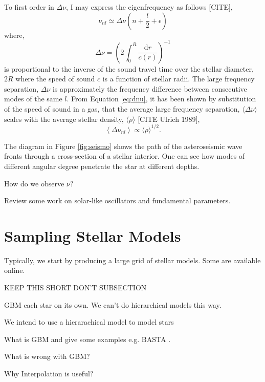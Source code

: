 To first order in $\Delta\nu$, I may express the eigenfrequency as follows [CITE],
%
\begin{equation}
    \nu_{nl} \simeq \Delta \nu\left(n+ \frac{l}{2} + \epsilon\right)
\end{equation}
%
where,
%
\begin{equation}
    \Delta \nu = \left(2 \int_{0}^{R} \frac{\mathrm{d} r}{c(r)}\right)^{-1}
    \label{eq:dnu}
\end{equation}
%
is proportional to the inverse of the sound travel time over the stellar diameter, $2R$ where the speed of sound $c$ is a function of stellar radii. The large frequency separation, $\Delta\nu$ is approximately the frequency difference between consecutive modes of the same $l$. From Equation \ref{eq:dnu}, it has been shown by substitution of the speed of sound in a gas, that the average large frequency separation, $\langle \Delta \nu \rangle$ scales with the average stellar density, $\langle\rho\rangle$ [CITE Ulrich 1989],
%
\begin{equation}
    \left\langle\Delta \nu_{n l}\right\rangle \propto \langle\rho\rangle^{1 / 2}.
\end{equation}
%

The diagram in Figure \ref{fig:seismo} shows the path of the asteroseismic wave fronts through a cross-section of a stellar interior. One can see how modes of different angular degree penetrate the star at different depths.

How do we observe $\nu$?

Review some work on solar-like oscillators and fundamental parameters.

\section{Sampling Stellar Models}

Typically, we start by producing a large grid of stellar models. Some are available online.

KEEP THIS SHORT DON'T SUBSECTION

GBM each star on its own. We can't do hierarchical models this way.

We intend to use a hierarachical model to model stars

What is GBM and give some examples e.g. BASTA \citet{SilvaAguirre.Davies.ea2015}.

What is wrong with GBM?

Why Interpolation is useful?

